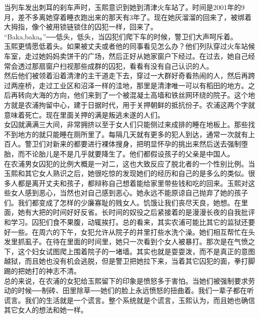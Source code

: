 当列车发出刺耳的刹车声时，玉熙意识到她到清津火车站了。时间是2001年的9月，差不多离她穿着睡衣跑出来的那天有3年了。现在她灰溜溜的回来了，被绑着大拇指，像个被用锁链锁住的囚犯一样，回来了。\\

“Baka,baka。”──低头，低头，当囚犯们爬下车的时候，警卫们大声呵斥着。\\

玉熙更情愿低着头。如果被丈夫或者他的同事看见怎么办？他们列队穿过火车站候车室，走过她妈妈卖饼干的广场，然后正好从她家窗户下经过。在过去，她自己经常会透过那扇窗户扫视那些成群的囚犯，看看有没有自己认识的人。\\

然后他们被领着沿着清津的主干道走下去，穿过一大群好奇看热闹的人，然后再跨过两座桥，走过工业区和沼泽一样的洼地，那里是清津唯一可以有稻田的地方。之后再转向大海的方向，他们来到了一个被混凝土高墙和铁丝网环绕的院子。这个地方就是农浦拘留中心，建于日据时代，用于关押朝鲜的抵抗份子。农浦这两个字就意味着死亡。现在里面关押的满是叛逃未遂的人们。\\

女囚就满满三大间，非常拥挤以至于女人们只能侧过来成排的睡在地板上。那些找不到地方的就只能睡在厕所里了。每隔几天就有更多的犯人到达，通常一次就有上百人。警卫们对新来的都要进行裸体搜身，把明显怀孕的挑出来然后送去强制堕胎，而不论胎儿是不是几乎就要降生了。他们都假设孩子的父亲是中国人。\\

在农浦男女囚犯的比例大概是一对二，这也大致反应了脱北者的一个性别比例。当玉熙和其它女人熟识之后，她很吃惊的发现她们的经历和自己的是多么的类似。很多人都是离开丈夫和孩子，都辩称自己想着能给家里带些钱和吃的回来。玉熙对这些女人感到恶心，当然也对自己感到恶心。她永远不能原谅自己抛弃了她的孩子们。我们都变成了怎样的少廉寡耻的贱女人。饥饿让我们丧尽天良，她想。在里面，她有大把的时间好好反省。长时间的奴役之后紧接着的是漫漫长夜的自我批评和学习。囚犯们食不果腹，动辄挨打。总的看来，其实农浦可能比其它的监狱还要好一些。在周六的下午，女犯允许从院子的井里打些水洗个澡。她们相互帮忙在头发里抓虱子。在待在里面的时间里，她只一次看到个女人被暴打。那次是在气愤之下，这个妇女试图爬上围着院子的一堵墙。其实也就是耍耍泼，而不是真正的意图越狱，而且她也没有机会逃脱，但是警卫把她拉下来，当着其它囚犯的面，拳打脚踢的把她打的神志不清。\\

总的来说，在农浦的女犯给玉熙留下的印象是愤怒多于害怕。当她们被强制要求劳动的时候──制砖、田里除草──她们的脸上永远愤怒的扭曲着。我们一辈子都在听谎言。我们的生活就是一个谎言。整个系统就是个谎言，玉熙认为，而且她也确信其它女人的想法和她一样。\\

